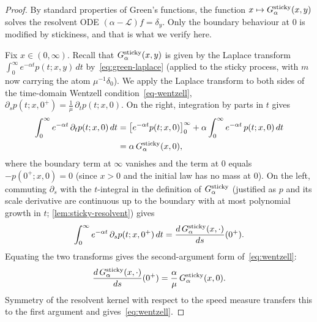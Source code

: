 \documentclass[aap,preprint]{imsart}
\numberwithin{equation}{section}
\theoremstyle{plain}
\theoremstyle{definition}
\begin{document}
\begin{proof}
  By standard properties of Green's functions,  the function $x\mapsto G^{\rm sticky}_\alpha(x,y)$ solves
the  resolvent ODE $(\alpha-\mathcal L)f=\delta_y$. Only the boundary behaviour at $0$ is
modified by stickiness, and that is what we verify here.


Fix $x\in(0,\infty)$. Recall that $G_\alpha^{\rm sticky}(x,y)$ is given by the Laplace transform $\int_0^\infty e^{-\alpha t} p(t;x,y)\,dt$ by~\cref{eq:green-laplace} (applied to the sticky process, with $m$ now carrying the atom $\mu^{-1}\delta_0$).  We apply the Laplace transform 
to both sides of the time-domain Wentzell condition~\cref{eq-wentzell},
\(
  \partial_s p(t;x,0^+) = \tfrac{1}{\mu}\,\partial_t p(t;x,0).
\) 
On the right, integration by parts in $t$ gives
\begin{align*}
  \int_0^\infty e^{-\alpha t}\,\partial_t p(t;x,0)\,dt
  &= \bigl[e^{-\alpha t}p(t;x,0)\bigr]_0^\infty
  + \alpha\int_0^\infty e^{-\alpha t}\,p(t;x,0)\,dt\\
  &= \alpha\,G^{\rm sticky}_\alpha(x,0),
\end{align*}
where the boundary term at $\infty$ vanishes and the term at $0$ equals
$-p(0^+;x,0)=0$ (since $x>0$ and the initial law has no mass at $0$). On the left, commuting $\partial_s$ with the $t$-integral in the definition of $G^{\rm sticky}_\alpha$ (justified as $p$ and its scale derivative are continuous up to the boundary with at most polynomial growth in $t$; \cref{lem:sticky-resolvent}) gives
\[
  \int_0^\infty e^{-\alpha t}\,\partial_s p(t;x,0^+)\,dt
   =  \frac{d\,G^{\rm sticky}_\alpha(x,\cdot)}{ds}(0^+).
\]
Equating the two transforms gives the second-argument form of~\cref{eq:wentzell}:
\[
  \frac{d\,G^{\rm sticky}_\alpha(x,\cdot)}{ds}(0^+)
   =  \frac{\alpha}{\mu}\,G^{\rm sticky}_\alpha(x,0).
\]
Symmetry of the resolvent kernel with respect to the speed measure
 transfers this to the first argument
and gives~\cref{eq:wentzell}. 
\end{proof}
\end{document}

